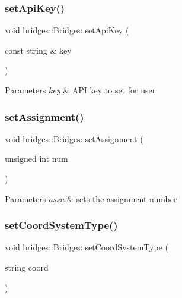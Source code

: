 \subsubsection{\texorpdfstring{setApiKey()}{setApiKey()}}
{\footnotesize\ttfamily void bridges\+::\+Bridges\+::set\+Api\+Key (\begin{DoxyParamCaption}\item[{const string \&}]{key }\end{DoxyParamCaption})\hspace{0.3cm}{\ttfamily [inline]}}


\begin{DoxyParams}{Parameters}
{\em key} & A\+PI key to set for user \\
\hline
\end{DoxyParams}
\mbox{\label{classbridges_1_1_bridges_aca7a68fb8cc0d1bec81656dfa77b1162}} 
\subsubsection{\texorpdfstring{setAssignment()}{setAssignment()}}
{\footnotesize\ttfamily void bridges\+::\+Bridges\+::set\+Assignment (\begin{DoxyParamCaption}\item[{unsigned int}]{num }\end{DoxyParamCaption})\hspace{0.3cm}{\ttfamily [inline]}}


\begin{DoxyParams}{Parameters}
{\em assn} & sets the assignment number \\
\hline
\end{DoxyParams}
\mbox{\label{classbridges_1_1_bridges_ad00c07d3a028110424909081a94c4013}} 
\subsubsection{\texorpdfstring{setCoordSystemType()}{setCoordSystemType()}}
{\footnotesize\ttfamily void bridges\+::\+Bridges\+::set\+Coord\+System\+Type (\begin{DoxyParamCaption}\item[{string}]{coord }\end{DoxyParamCaption})\hspace{0.3cm}{\ttfamily [inline]}}


